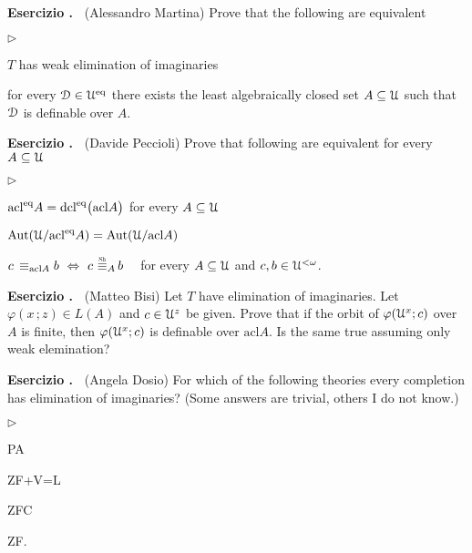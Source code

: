 \documentclass[10pt]{article}
\def\phi{\varphi}
\def\D{\EuScript D}
\def\U{\EuScript U}
\def\IFF{\Leftrightarrow}
\def\Aut{\textrm{Aut}}
\def\acl{\textrm{acl}}
\def\dcl{\textrm{dcl}}
\def\eq{{\rm eq}}
\def\equivSh{\stackrel{\smash{\scalebox{.5}{\rm Sh}}}{\equiv}}
\newcommand{\labella}[1]{{\sf\footnotesize #1}\hfill}
\renewenvironment{itemize}
  {\begin{list}{$\triangleright$}{%
   \setlength{\parskip}{0mm}
   \setlength{\topsep}{0mm}
   \setlength{\rightmargin}{0mm}
   \setlength{\listparindent}{0mm}
   \setlength{\itemindent}{0mm}
   \setlength{\labelwidth}{3ex}
   \setlength{\itemsep}{0mm}
   \setlength{\parsep}{0mm}
   \setlength{\partopsep}{0mm}
   \setlength{\labelsep}{1ex}
   \setlength{\leftmargin}{\labelwidth+\labelsep}
   \let\makelabel\labella}}{%
   \vspace*{-.3\baselineskip}
  \end{list}}
\newcounter{ex}
\newenvironment{exercise}{\bigskip\addtocounter{ex}{1}\textbf{Esercizio \theex.\ }}{}
\begin{document}
\begin{exercise}
  (Alessandro Martina)
  Prove that the following are equivalent
  \begin{itemize}
  \item[1.] $T$ has weak elimination of imaginaries
  \item[2.] for every $\D\in \U^\eq$ there exists the least algebraically closed set $A\subseteq\U$ such that $\D$ is definable over $A$.
  \end{itemize}
\end{exercise}

\begin{exercise}
  (Davide Peccioli)
  Prove that following are equivalent for every $A\subseteq\U$
  \begin{itemize}
  \item[1.]  $\acl^\eq A=\dcl^\eq\big(\acl A\big)$ for every $A\subseteq\U$
  \item[2.]  $\Aut(\U/\acl^\eq A)= \Aut(\U/\acl A)$
  \item[3.] $c\,\equiv_{\acl A}b\ \IFF\ c\ \smash{\equivSh_A}\, b$ \ \ for every $A\subseteq\U$ and  $c,b\in\U^{<\omega}$.
  \end{itemize} 
\end{exercise}

\begin{exercise}
  (Matteo Bisi)
  Let $T$ have elimination of imaginaries.
  Let $\phi(x\,;z)\in L(A)$ and  $c\in\U^z$ be given.
  Prove that if the orbit of $\phi(\U^x; c)$ over $A$ is finite, then $\phi(\U^x; c)$ is definable over $\acl A$.
  Is the same true assuming only weak elemination?
\end{exercise}

\begin{exercise}
  (Angela Dosio)
  For which of the following theories every completion has elimination of imaginaries?
  (Some answers are trivial, others I do not know.)
  \begin{itemize}
    \item [1.] PA
    \item [2.] ZF+V=L
    \item [3.] ZFC
    \item [4.] ZF.
  \end{itemize}
\end{exercise}
\end{document}
